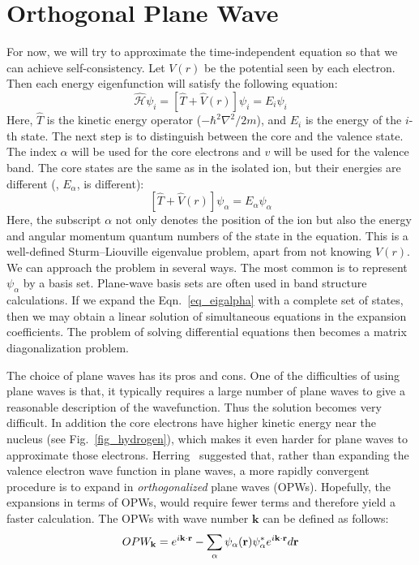 \chapter{Orthogonal Plane Wave}\label{appen_opw}

For now, we will try to approximate the time-independent \schrod equation so that we can achieve self-consistency. Let $V(r)$ be the potential seen by each electron. Then each energy eigenfunction will satisfy the following equation:
\begin{equation}
\label{eigeqn}
\hat{\mathcal{H}}\psi_i = \left[\hat{T}+\hat{V}(r)\right]\psi_i = E_i\psi_i 
\end{equation}
Here, $\hat{T}$ is the kinetic energy operator ($-\hbar^2\nabla^2/2m$), and $E_i$ is the energy of the $i$-th state. The next step is to distinguish between the core and the valence state. The index $\alpha$ will be used for the core electrons and $v$ will be used for the valence band. The core states are the same as in the isolated ion, but their energies are different (\ie, $E_\alpha$, is different):
\begin{equation}
\label{eq_eigalpha}
\left[\hat{T}+\hat{V}(r)\right]\psi_\alpha = E_\alpha \psi_\alpha
\end{equation}
Here, the subscript $\alpha$ not only denotes the position of the ion but also the energy and angular momentum quantum numbers of the state in the equation. This is a well-defined Sturm--Liouville eigenvalue problem, apart from not knowing $V(r)$. We can approach the problem in several ways. The most common is to represent $\psi_{\alpha}$ by a basis set. Plane-wave basis sets are often used in band structure calculations. If we expand the \schrod Eqn.~\eqref{eq_eigalpha} with a complete set of states,  then we may obtain a linear solution of simultaneous equations in the expansion coefficients. The problem of  solving differential equations then becomes a matrix diagonalization problem. 

The choice of plane waves has its pros and cons. One of the difficulties of using plane waves is that, it typically requires a large number of plane waves to give a reasonable description of the wavefunction. Thus the solution becomes very difficult. In addition the core electrons have higher kinetic energy near the nucleus (see Fig.~\ref{fig_hydrogen}), which makes it even harder for plane waves to approximate those electrons. Herring~\cite{herring1940new} suggested that, rather than expanding the valence electron wave function in plane waves, a more rapidly convergent procedure is to expand in \textit{orthogonalized} plane waves (OPWs). Hopefully, the expansions in terms of OPWs, would require fewer terms and therefore yield a faster calculation. The OPWs with wave number $\mathbf{k}$ can be defined as follows:
\begin{equation}
\label{eq_opw}
OPW_{\vb{k}} = e^{i\vb{k\cdot r}} - \sum_{\alpha} \psi_{\alpha}(\vb{r}) \psi^{\ast}_{\alpha} e^{i{\vb{k\cdot r}}} d \vb{r}
\end{equation}

